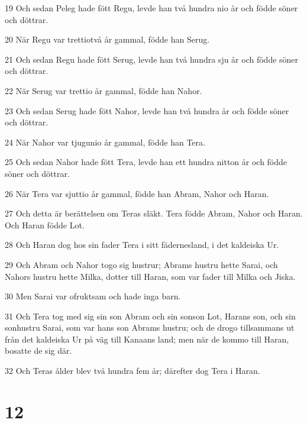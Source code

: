 \par 19 Och sedan Peleg hade fött Regu, levde han två hundra nio år och födde söner och döttrar.
\par 20 När Regu var trettiotvå år gammal, födde han Serug.
\par 21 Och sedan Regu hade fött Serug, levde han två hundra sju år och födde söner och döttrar.
\par 22 När Serug var trettio år gammal, födde han Nahor.
\par 23 Och sedan Serug hade fött Nahor, levde han två hundra år och födde söner och döttrar.
\par 24 När Nahor var tjugunio år gammal, födde han Tera.
\par 25 Och sedan Nahor hade fött Tera, levde han ett hundra nitton år och födde söner och döttrar.
\par 26 När Tera var sjuttio år gammal, födde han Abram, Nahor och Haran.
\par 27 Och detta är berättelsen om Teras släkt. Tera födde Abram, Nahor och Haran. Och Haran födde Lot.
\par 28 Och Haran dog hos sin fader Tera i sitt fädernesland, i det kaldeiska Ur.
\par 29 Och Abram och Nahor togo sig hustrur; Abrams hustru hette Sarai, och Nahors hustru hette Milka, dotter till Haran, som var fader till Milka och Jiska.
\par 30 Men Sarai var ofruktsam och hade inga barn.
\par 31 Och Tera tog med sig sin son Abram och sin sonson Lot, Harans son, och sin sonhustru Sarai, som var hans son Abrams hustru; och de drogo tillsammans ut från det kaldeiska Ur på väg till Kanaans land; men när de kommo till Haran, bosatte de sig där.
\par 32 Och Teras ålder blev två hundra fem år; därefter dog Tera i Haran.

\chapter{12}

